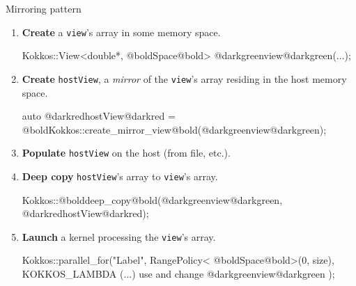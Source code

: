 
\begin{frame}[fragile]{Mirroring pattern}

  \begin{enumerate}
    \item<+->{\textbf{Create} a {\color{darkgreen}\texttt{view}}'s array in some memory space. \\

      \vspace{-5pt}
      \begin{code}[keywords={view_type}]
  Kokkos::View<double*, @boldSpace@bold> @darkgreenview@darkgreen(...);
      \end{code}
      \vspace{-4pt}

  }
    \item<+->{\textbf{Create} {\color{darkred}\texttt{hostView}}, a \textit{mirror} of the {\color{darkgreen}\texttt{view}}'s array residing in the host memory space. \\

      \vspace{-5pt}
      \begin{code}[keywords={view_type}]
  auto @darkredhostView@darkred = @boldKokkos::create_mirror_view@bold(@darkgreenview@darkgreen);
      \end{code}
      \vspace{-4pt}

  }
    \item<+->{\textbf{Populate} {\color{darkred}\texttt{hostView}} on the host (from file, etc.).}
    \item<+->{\textbf{Deep copy} {\color{darkred}\texttt{hostView}}'s array to {\color{darkgreen}\texttt{view}}'s array. \\

      \vspace{-5pt}
      \begin{code}[keywords={}]
  Kokkos::@bolddeep_copy@bold(@darkgreenview@darkgreen, @darkredhostView@darkred);
      \end{code}
      \vspace{-4pt}

  }
    \item<+->{\textbf{Launch} a kernel processing the {\color{darkgreen}\texttt{view}}'s array. \\

      \vspace{-5pt}
      \begin{code}[keywords={}]
  Kokkos::parallel_for("Label",
    RangePolicy< @boldSpace@bold>(0, size),
    KOKKOS_LAMBDA (...) { use and change @darkgreenview@darkgreen });
      \end{code}
      \vspace{-4pt}

}
\end{enumerate}
\end{frame}
